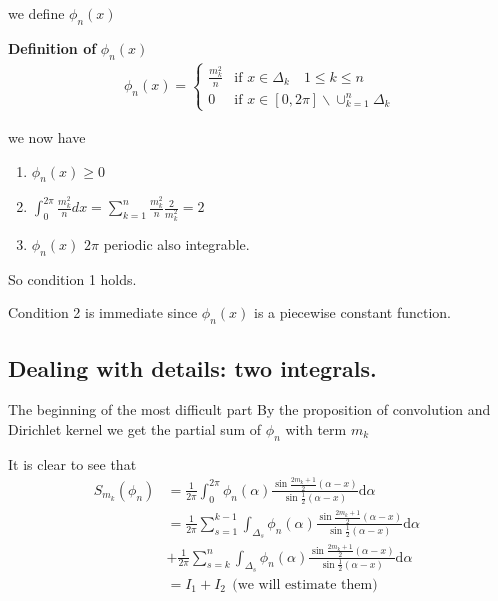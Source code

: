 \documentclass{beamer}
\begin{document}
\begin{frame}{we define $ \phi_n(x) $}
    \begin{block}{\textbf{Definition of }$ \phi_n(x) $} 
        \begin{align}
            \phi_n(x) =
            \begin{cases}
                \frac{m_k^2}{n}& \text{if } x\in \Delta_k \quad 1 \leqslant k \leqslant n \\
                0 & \text{if } x \in [0,2\pi]\backslash \cup_{k=1}^n \Delta_k
            \end{cases}
            \end{align}
    \end{block}


    we now have 

\begin{enumerate}
    \item $ \phi_n(x)\geqslant 0 $
    \item $ \int_{0}^{2\pi}\frac{m_k^2}{n}dx = \sum_{k=1}^{n}\frac{m_k^2}{n}\frac{2}{m_k^2}=2 $
    \item $\phi_n(x) $ $ 2\pi $ periodic also integrable.
\end{enumerate}

So condition 1 holds.\par
Condition 2 is immediate since $ \phi_n(x) $ is a piecewise constant function.\par
\end{frame}






 





\subsection{Dealing with details: two integrals.}

\begin{frame}{The beginning of the most difficult part}
    By the proposition of convolution and Dirichlet kernel we get the partial sum of $ \phi_n $ with term $ m_k $
    \begin{block}{}
        It is clear to see that 
        \begin{align*}
            S_{m_k}(\phi_n)&=\frac{1}{2\pi}\int_{0}^{2\pi}\phi_n(\alpha)\frac{\sin\frac{2m_k+1}{2}(\alpha-x)}{\sin\frac{1}{2}(\alpha-x)}\mathrm{d}\alpha\\
            &=\frac{1}{2\pi}\sum_{s=1}^{k-1}\int_{\Delta_s}\phi_n(\alpha)\frac{\sin\frac{2m_k+1}{2}(\alpha-x)}{\sin\frac{1}{2}(\alpha-x)}\mathrm{d}\alpha \\
            &+ \frac{1}{2\pi}\sum_{s=k}^{n}\int_{\Delta_s}\phi_n(\alpha)\frac{\sin\frac{2m_k+1}{2}(\alpha-x)}{\sin\frac{1}{2}(\alpha-x)}\mathrm{d}\alpha \quad \\
            &=I_1+I_2 \ \ \text{(we will estimate them) }
        \end{align*}
       
    \end{block}

\end{frame}
\end{document}
